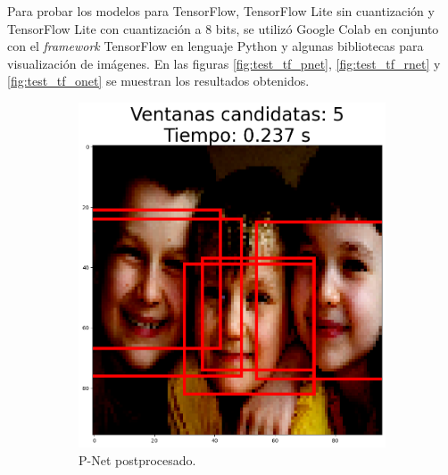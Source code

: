 Para probar los modelos para TensorFlow, TensorFlow Lite sin cuantización y TensorFlow Lite con cuantización a 8 bits, se utilizó Google Colab en conjunto con el \textit{framework} TensorFlow en lenguaje Python y algunas bibliotecas para visualización de imágenes. En las figuras \ref{fig:test_tf_pnet}, \ref{fig:test_tf_rnet} y \ref{fig:test_tf_onet} se muestran los resultados obtenidos.

\begin{figure}[!htpb]
     \centering
     \begin{subfigure}[b]{0.28\textwidth}
         \centering
         \includegraphics[width=\textwidth]{./Figures/test_tf_pnet_a.png}
         \caption{P-Net postprocesado.}
         \label{fig:1de3}
     \end{subfigure}
     \hfill
     \begin{subfigure}[b]{0.28\textwidth}
         \centering

\end{subfigure}
\end{figure}
